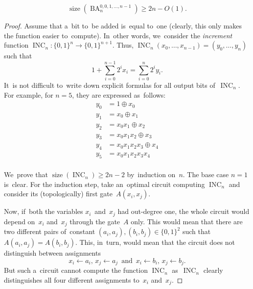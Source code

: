 \documentclass[a4paper, UKenglish, cleveref, autoref,  thm-restate]{lipics-v2021}
\DeclareMathOperator{\BA}{BA}
\DeclareMathOperator{\INC}{INC}
\DeclareMathOperator{\size}{size}
\begin{document}
    \begin{theorem}
        \label{theorem:lowerbound}
        \[\size(\BA_n^{0,0,1,\dotsc,n-1}) \ge 2n-O(1).\]
    \end{theorem}
    \begin{proof}
        Assume that a~bit to~be added is~equal to~one (clearly, this only makes the function easier to~compute). In~other words,
        we~consider the \emph{increment} function $\INC_n \colon \{0,1\}^n \to \{0,1\}^{n+1}$. Thus, $\INC_n(x_0, \dotsc, x_{n-1})=(y_0, \dotsc, y_n)$ such that
        \[1+\sum_{i=0}^{n-1}2^ix_i=\sum_{i=0}^n2^iy_i.\]
        It~is not difficult to~write down explicit formulas for all output bits of~$\INC_n$. For example, for $n=5$, they are expressed as~follows:
        \begin{align*}
            y_0 &= 1 \oplus x_0\\
            y_1 &= x_0 \oplus x_1\\
            y_2 &= x_0x_1 \oplus x_2\\
            y_3 &= x_0x_1x_2 \oplus x_3\\
            y_4 &= x_0x_1x_2x_3 \oplus x_4\\
            y_5 &= x_0x_1x_2x_3x_4\\
        \end{align*}

        We~prove that $\size(\INC_n) \ge 2n-2$ by~induction on~$n$.
        The base case $n=1$ is~clear. For the induction step, take an~optimal circuit computing $\INC_n$ and consider its (topologically) first gate~$A(x_i, x_j)$.

        Now, if~both the variables $x_i$~and~$x_j$ had out-degree one, the whole circuit would depend on~$x_i$ and~$x_j$ through the gate~$A$ only. This would mean that there are two different pairs of~constant $(a_i, a_j), (b_i, b_j) \in \{0,1\}^2$ such that $A(a_i, a_j)=A(b_i, b_j)$. This, in~turn, would mean that the circuit does not distinguish between assignments
        \[x_i \gets a_i,\, x_j \gets a_j \,\text{ and }\, x_i \gets b_i,\, x_j \gets b_j.\]
        But such a~circuit cannot compute the function $\INC_n$ as~$\INC_n$ clearly distinguishes all four different assignments to~$x_i$ and~$x_j$.


\end{proof}
\end{document}
